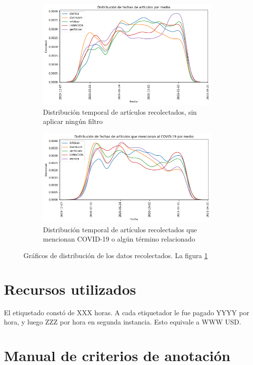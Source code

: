 \begin{figure}
    \centering
    \begin{subfigure}[t]{\textwidth}
        \includegraphics[width=\textwidth]{img/fechas_por_medios_todas.png}
        \caption{Distribución temporal de artículos recolectados, sin aplicar ningún filtro}
        \label{fig:fecha_articulos_por_medio_todas}
    \end{subfigure}

    \begin{subfigure}[t]{\textwidth}
        \includegraphics[width=\textwidth]{img/fechas_por_medios.png}
        \caption{Distribución temporal de artículos recolectados que mencionan COVID-19 o algún término relacionado}
        \label{fig:fecha_articulos_por_medio_covid}
    \end{subfigure}

    \caption{Gráficos de distribución de los datos recolectados. La figura \ref{fig:fecha_articulos_por_medio_todas}}
\end{figure}


\section{Recursos utilizados}

El etiquetado constó de XXX horas. A cada etiquetador le fue pagado YYYY por hora, y luego ZZZ por hora en segunda instancia. Esto equivale a WWW USD.

\section{Manual de criterios de anotación}
\label{app:manual_criterios_anotacion}
